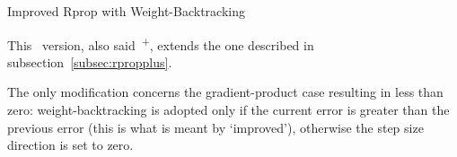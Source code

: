 \begin{subsection}{Improved Rprop with Weight-Backtracking}
    \par This~ version, also said~\textsuperscript{+}, extends the one described in subsection~\ref{subsec:rpropplus}.
    \par The only modification concerns the gradient-product case resulting in less than zero: weight-backtracking is adopted only if the current error is greater than the previous error (this is what is meant by `improved'), otherwise the step size direction is set to zero.
    
    \clearpage
\end{subsection}